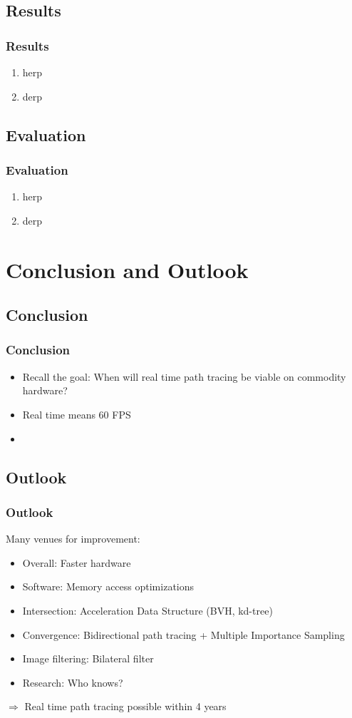 \documentclass{beamer}
\begin{document}
\subsection{Results}
\begin{frame}
    \frametitle{Results}
    \begin{enumerate}
        \item herp
        \item derp
    \end{enumerate}
\end{frame}

\subsection{Evaluation}
\begin{frame}
    \frametitle{Evaluation}
    \begin{enumerate}
        \item herp
        \item derp
    \end{enumerate}
\end{frame}

\section{Conclusion and Outlook}
\subsection{Conclusion}
\begin{frame}
    \frametitle{Conclusion}
    \begin{itemize}
        \item Recall the goal: When will real time path tracing be viable on commodity hardware?
        \item Real time means 60 FPS
        \pause
        \item 
    \end{itemize}
\end{frame}

\subsection{Outlook}
\begin{frame}
    \frametitle{Outlook}
    Many venues for improvement:
    \pause
    \begin{itemize}
        \item Overall: Faster hardware
        \pause
        \item Software: Memory access optimizations
        \pause
        \item Intersection: Acceleration Data Structure (BVH, kd-tree)
        \pause
        \item Convergence: Bidirectional path tracing + Multiple Importance Sampling
        \pause
        \item Image filtering: Bilateral filter
        \pause
        \item Research: Who knows?
    \end{itemize}
    \pause
    \(\Longrightarrow\) Real time path tracing possible within 4 years
\end{frame}
\end{document}
